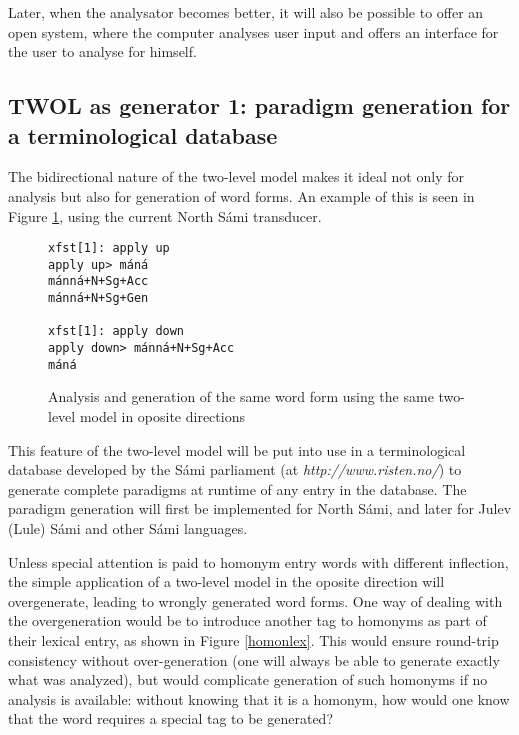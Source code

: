 \documentclass[a4paper,english]{article}
\begin{document}
Later, when the analysator becomes better, it will also be possible to offer an open system, where the computer analyses user input and offers an interface for the user to analyse for himself. 

\subsection{TWOL as generator 1: paradigm generation for a terminological database}\label{term}

The bidirectional nature of the two-level model makes it ideal not only for analysis but also for generation of word forms. An example of this is seen in Figure \ref{anagen}, using the current North Sámi transducer.

\begin{figure}[htb]
\caption{Analysis and generation of the same word form using the same two-level model in oposite directions}
\begin{center}
\begin{verbatim}
xfst[1]: apply up
apply up> máná
mánná+N+Sg+Acc
mánná+N+Sg+Gen

xfst[1]: apply down
apply down> mánná+N+Sg+Acc
máná
\end{verbatim}
\end{center}
\label{anagen}
\end{figure}

This feature of the two-level model will be put into use in a terminological database developed by the Sámi parliament (at \textit{http://www.risten.no/}) to generate complete paradigms at runtime of any entry in the database. The paradigm generation will first be implemented for North Sámi, and later for Julev (Lule) Sámi and other Sámi languages.

Unless special attention is paid to homonym entry words with different inflection, the simple application of a two-level model in the oposite direction will overgenerate, leading to wrongly generated word forms. One way of dealing with the overgeneration would be to introduce another tag to homonyms as part of their lexical entry, as shown in Figure \ref{homonlex}. This would ensure round-trip consistency without over-generation (one will always be able to generate exactly what was analyzed), but would complicate generation of such homonyms if no analysis is available: without knowing that it is a homonym, how would one know that the word requires a special tag to be generated?
\end{document}
